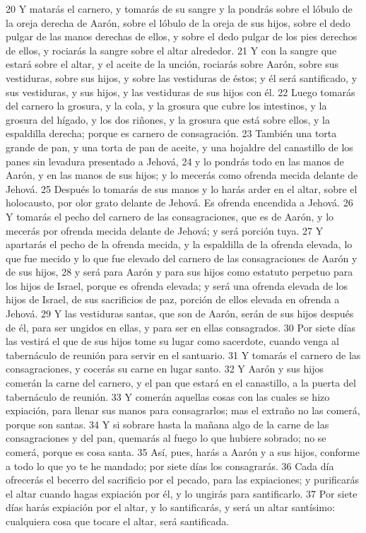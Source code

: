 20 Y matarás el carnero, y tomarás de su sangre y la pondrás sobre el lóbulo de la oreja derecha de Aarón, sobre el lóbulo de la oreja de sus hijos, sobre el dedo pulgar de las manos derechas de ellos, y sobre el dedo pulgar de los pies derechos de ellos, y rociarás la sangre sobre el altar alrededor.
21 Y con la sangre que estará sobre el altar, y el aceite de la unción, rociarás sobre Aarón, sobre sus vestiduras, sobre sus hijos, y sobre las vestiduras de éstos; y él será santificado, y sus vestiduras, y sus hijos, y las vestiduras de sus hijos con él.
22 Luego tomarás del carnero la grosura, y la cola, y la grosura que cubre los intestinos, y la grosura del hígado, y los dos riñones, y la grosura que está sobre ellos, y la espaldilla derecha; porque es carnero de consagración.
23 También una torta grande de pan, y una torta de pan de aceite, y una hojaldre del canastillo de los panes sin levadura presentado a Jehová,
24 y lo pondrás todo en las manos de Aarón, y en las manos de sus hijos; y lo mecerás como ofrenda mecida delante de Jehová.
25 Después lo tomarás de sus manos y lo harás arder en el altar, sobre el holocausto, por olor grato delante de Jehová. Es ofrenda encendida a Jehová.
26 Y tomarás el pecho del carnero de las consagraciones, que es de Aarón, y lo mecerás por ofrenda mecida delante de Jehová; y será porción tuya.
27 Y apartarás el pecho de la ofrenda mecida, y la espaldilla de la ofrenda elevada, lo que fue mecido y lo que fue elevado del carnero de las consagraciones de Aarón y de sus hijos,
28 y será para Aarón y para sus hijos como estatuto perpetuo para los hijos de Israel, porque es ofrenda elevada; y será una ofrenda elevada de los hijos de Israel, de sus sacrificios de paz, porción de ellos elevada en ofrenda a Jehová.
29 Y las vestiduras santas, que son de Aarón, serán de sus hijos después de él, para ser ungidos en ellas, y para ser en ellas consagrados.
30 Por siete días las vestirá el que de sus hijos tome su lugar como sacerdote, cuando venga al tabernáculo de reunión para servir en el santuario.
31 Y tomarás el carnero de las consagraciones, y cocerás su carne en lugar santo.
32 Y Aarón y sus hijos comerán la carne del carnero, y el pan que estará en el canastillo, a la puerta del tabernáculo de reunión.
33 Y comerán aquellas cosas con las cuales se hizo expiación, para llenar sus manos para consagrarlos; mas el extraño no las comerá, porque son santas.
34 Y si sobrare hasta la mañana algo de la carne de las consagraciones y del pan, quemarás al fuego lo que hubiere sobrado; no se comerá, porque es cosa santa.
35 Así, pues, harás a Aarón y a sus hijos, conforme a todo lo que yo te he mandado; por siete días los consagrarás.
36 Cada día ofrecerás el becerro del sacrificio por el pecado, para las expiaciones; y purificarás el altar cuando hagas expiación por él, y lo ungirás para santificarlo.
37 Por siete días harás expiación por el altar, y lo santificarás, y será un altar santísimo: cualquiera cosa que tocare el altar, será santificada.

